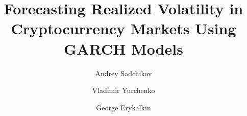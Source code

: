 \title{Forecasting Realized Volatility in Cryptocurrency Markets Using GARCH Models
}
%
%
\author{Andrey Sadchikov\and
Vladimir Yurchenko\and
George Erykalkin
}
%
%
